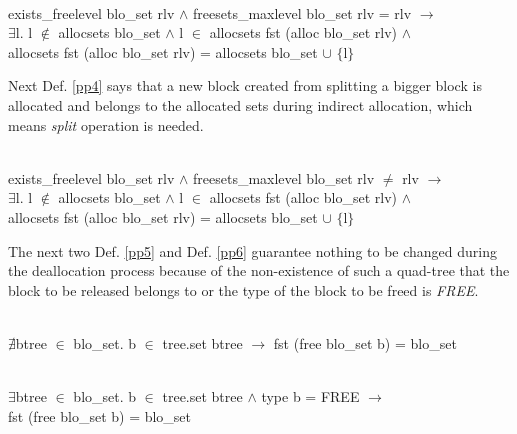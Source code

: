 \begin{definition}  \\
	exists\_freelevel blo\_set rlv $\wedge$ freesets\_maxlevel blo\_set rlv = rlv $\longrightarrow$ \\
	\phantom{x} \hspace{10pt} $\exists$l. l $\notin$ allocsets blo\_set $\wedge$ l $\in$ allocsets fst (alloc blo\_set rlv) $\wedge$ \\
	\phantom{x} \hspace{10pt} allocsets fst (alloc blo\_set rlv) = allocsets blo\_set $\cup$ $\lbrace$l$\rbrace$
	\label{pp3}
\end{definition}

Next Def. \ref{pp4} says that a new block created from splitting a bigger block is allocated and belongs to the allocated sets during indirect allocation, which means \emph{split} operation is needed.

\begin{definition}  \\
	exists\_freelevel blo\_set rlv $\wedge$ freesets\_maxlevel blo\_set rlv $\neq$ rlv $\longrightarrow$ \\
	\phantom{x} \hspace{10pt} $\exists$l. l $\notin$ allocsets blo\_set $\wedge$ l $\in$ allocsets fst (alloc blo\_set rlv) $\wedge$ \\
	\phantom{x} \hspace{10pt} allocsets fst (alloc blo\_set rlv) = allocsets blo\_set $\cup$ $\lbrace$l$\rbrace$
	\label{pp4}
\end{definition}

The next two Def. \ref{pp5} and Def. \ref{pp6} guarantee nothing to be changed during the deallocation process because of the non-existence of such a quad-tree that the block to be released belongs to or the type of the block to be freed is \emph{FREE}.

\begin{definition}  \\
	$\nexists$btree $\in$ blo\_set. b $\in$ tree.set btree $\longrightarrow$ fst (free blo\_set b) = blo\_set
	\label{pp5}
\end{definition}

\begin{definition}  \\
	$\exists$btree $\in$ blo\_set. b $\in$ tree.set btree $\wedge$ type b = FREE $\longrightarrow$ \\
	\phantom{x} \hspace{10pt} fst (free blo\_set b) = blo\_set
	\label{pp6}
\end{definition}

